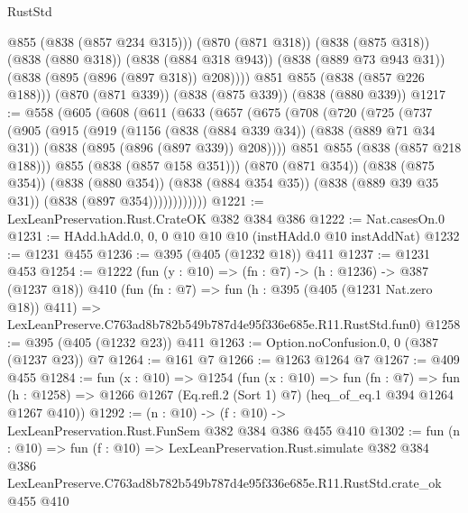 \begin{lexlean}{RustStd}
\begin{coremodule}
            @855
            (@838 (@857 @234 @315)))
          (@870 (@871 @318))
          (@838 (@875 @318))
          (@838 (@880 @318))
          (@838 (@884 @318 @943))
          (@838 (@889 @73 @943 @31))
          (@838 (@895 (@896 (@897 @318)) @208))))
      @851
      @855
      (@838 (@857 @226 @188)))
    (@870 (@871 @339))
    (@838 (@875 @339))
    (@838 (@880 @339))
@1217 := @558
    (@605
      (@608
        (@611
          (@633
            (@657
              (@675
                (@708
                  (@720
                    (@725
                      (@737
                        (@905
                          (@915
                            (@919
                              (@1156
                                (@838 (@884 @339 @34))
                                (@838 (@889 @71 @34 @31))
                                (@838 (@895 (@896 (@897 @339)) @208))))
                            @851
                            @855
                            (@838 (@857 @218 @188)))
                          @855
                          (@838 (@857 @158 @351)))
                        (@870 (@871 @354))
                        (@838 (@875 @354))
                        (@838 (@880 @354))
                        (@838 (@884 @354 @35))
                        (@838 (@889 @39 @35 @31))
                        (@838 (@897 @354))))))))))))
@1221 := LexLeanPreservation.Rust.CrateOK @382 @384 @386
@1222 := Nat.casesOn.{0}
@1231 := HAdd.hAdd.{0, 0, 0} @10 @10 @10 (instHAdd.{0} @10 instAddNat)
@1232 := @1231 @455
@1236 := @395 (@405 (@1232 @18)) @411
@1237 := @1231 @453
@1254 := @1222
    (fun (y : @10) => (fn : @7) -> (h : @1236) -> @387 (@1237 @18))
    @410
    (fun (fn : @7) =>
    fun (h : @395 (@405 (@1231 Nat.zero @18)) @411) =>
    LexLeanPreserve.C763ad8b782b549b787d4e95f336e685e.R11.RustStd.fun0)
@1258 := @395 (@405 (@1232 @23)) @411
@1263 := Option.noConfusion.{0, 0} (@387 (@1237 @23)) @7
@1264 := @161 @7
@1266 := @1263 @1264 @7
@1267 := @409 @455
@1284 := fun (x : @10) =>
  @1254
    (fun (x : @10) =>
    fun (fn : @7) =>
    fun (h : @1258) => @1266 @1267 (Eq.refl.{2} (Sort 1) @7) (heq_of_eq.{1} @394 @1264 @1267 @410))
@1292 := (n : @10) -> (f : @10) -> LexLeanPreservation.Rust.FunSem @382 @384 @386 @455 @410
@1302 := fun (n : @10) =>
  fun (f : @10) =>
  LexLeanPreservation.Rust.simulate
    @382
    @384
    @386
    LexLeanPreserve.C763ad8b782b549b787d4e95f336e685e.R11.RustStd.crate_ok
    @455
    @410
\end{coremodule}
\end{lexlean}
